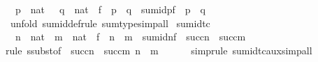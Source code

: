 \begin{isabellebody}
\ \ {\isachardoublequoteopen}p\ {\isasymin}\ nat\ {\isasymLongrightarrow}\ \ q\ {\isasymin}\ nat\ {\isasymLongrightarrow}\ f\ {\isasymin}\ p\ {\isasymrightarrow}\ q\ {\isasymLongrightarrow}\ sum{\isacharunderscore}{\kern0pt}id{\isacharparenleft}{\kern0pt}p{\isacharcomma}{\kern0pt}f{\isacharparenright}{\kern0pt}\ {\isasymin}\ {}{\isacharhash}{\kern0pt}{\isacharplus}{\kern0pt}p\ {\isasymrightarrow}\ {}{\isacharhash}{\kern0pt}{\isacharplus}{\kern0pt}q{\isachardoublequoteclose}\isanewline
%
\isadelimproof
\ \ %
\endisadelimproof
%
\isatagproof
{}\isamarkupfalse%
\ {\isacharparenleft}{\kern0pt}unfold\ sum{\isacharunderscore}{\kern0pt}id{\isacharunderscore}{\kern0pt}def{\isacharcomma}{\kern0pt}rule\ sum{\isacharunderscore}{\kern0pt}type{\isacharcomma}{\kern0pt}simp{\isacharunderscore}{\kern0pt}all{\isacharparenright}{\kern0pt}%
\endisatagproof
{\isafoldproof}%
%
\isadelimproof
\isanewline
%
\endisadelimproof
\isanewline
{}\isamarkupfalse%
\ sum{\isacharunderscore}{\kern0pt}id{\isacharunderscore}{\kern0pt}tc\ {\isacharcolon}{\kern0pt}\isanewline
\ \ {\isachardoublequoteopen}n\ {\isasymin}\ nat\ {\isasymLongrightarrow}\ m\ {\isasymin}\ nat\ {\isasymLongrightarrow}\ f\ {\isasymin}\ n\ {\isasymrightarrow}\ m\ {\isasymLongrightarrow}\ sum{\isacharunderscore}{\kern0pt}id{\isacharparenleft}{\kern0pt}n{\isacharcomma}{\kern0pt}f{\isacharparenright}{\kern0pt}\ {\isasymin}\ succ{\isacharparenleft}{\kern0pt}n{\isacharparenright}{\kern0pt}\ {\isasymrightarrow}\ succ{\isacharparenleft}{\kern0pt}m{\isacharparenright}{\kern0pt}{\isachardoublequoteclose}\isanewline
%
\isadelimproof
\ \ %
\endisadelimproof
%
\isatagproof
{}\isamarkupfalse%
{\isacharparenleft}{\kern0pt}rule\ ssubst{\isacharbrackleft}{\kern0pt}of\ \ {\isachardoublequoteopen}succ{\isacharparenleft}{\kern0pt}n{\isacharparenright}{\kern0pt}\ {\isasymrightarrow}\ succ{\isacharparenleft}{\kern0pt}m{\isacharparenright}{\kern0pt}{\isachardoublequoteclose}\ {\isachardoublequoteopen}{}{\isacharhash}{\kern0pt}{\isacharplus}{\kern0pt}n\ {\isasymrightarrow}\ {}{\isacharhash}{\kern0pt}{\isacharplus}{\kern0pt}m{\isachardoublequoteclose}{\isacharbrackright}{\kern0pt}{\isacharcomma}{\kern0pt}\isanewline
\ \ \ \ \ \ simp{\isacharcomma}{\kern0pt}rule\ sum{\isacharunderscore}{\kern0pt}id{\isacharunderscore}{\kern0pt}tc{\isacharunderscore}{\kern0pt}aux{\isacharcomma}{\kern0pt}simp{\isacharunderscore}{\kern0pt}all{\isacharparenright}{\kern0pt}%
\endisatagproof
{\isafoldproof}%
%
\isadelimproof
%
\endisadelimproof
%
\isadelimdocument
%
\endisadelimdocument

\end{isabellebody}
